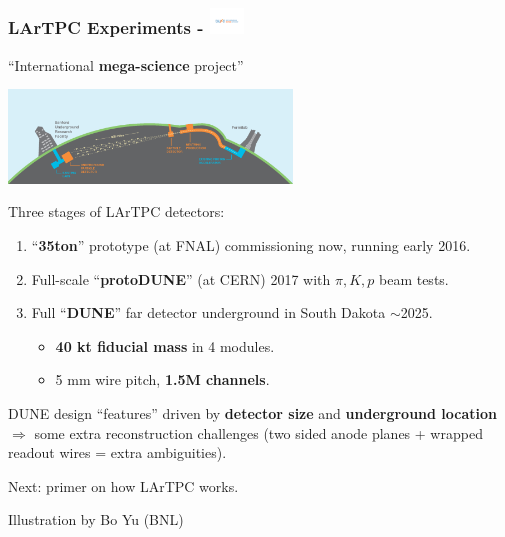 \documentclass[xcolor=dvipsnames]{beamer}
\begin{document}
\begin{frame}[fragile]
  \frametitle{LArTPC Experiments - \includegraphics[height=7mm,trim=4cm 9.2cm 4cm 9.3cm,clip,valign=c]{DUNElogo_colorHORIZONTAL.pdf}}
  \begin{center}
    ``International \textbf{mega-science} project''

    \includegraphics[height=25mm]{LBNF_Graphic_021715-1024x340.png}
  \end{center}


  Three stages of LArTPC detectors:
  \begin{enumerate}\footnotesize
  \item ``\textbf{35ton}'' prototype (at FNAL) commissioning now, running early 2016.
  \item Full-scale ``\textbf{protoDUNE}'' (at CERN) 2017 with $\pi, K, p$ beam tests.
  \item Full ``\textbf{DUNE}'' far detector underground in South Dakota $\sim$2025.
    \begin{itemize}
    \item \textbf{40 kt fiducial mass} in 4 modules.
    \item 5 mm wire pitch, \textbf{1.5M channels}.
    \end{itemize}
  \end{enumerate}

  \footnotesize DUNE design ``features'' driven by \textbf{detector
    size} and \textbf{underground location} $\Rightarrow$ some extra
  reconstruction challenges (two sided anode planes + wrapped readout
  wires = extra ambiguities).



\end{frame}

\begin{frame}

  \vfill

  \begin{center}
    Next: primer on how LArTPC works.
  \end{center}

  \vfill

  \flushright \scriptsize Illustration by Bo Yu (BNL)
\end{frame}
\end{document}
